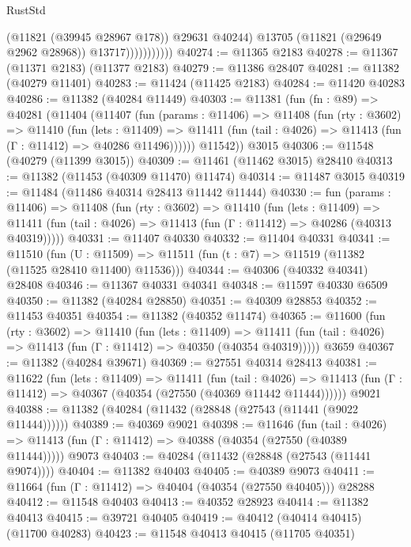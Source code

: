 \begin{lexlean}{RustStd}
\begin{coremodule}
                            (@11821 (@39945 @28967 @178))
                            @29631
                            @40244)
                          @13705
                          (@11821 (@29649 @2962 @28968))
                          @13717)))))))))))
@40274 := @11365 @2183
@40278 := @11367 (@11371 @2183) (@11377 @2183)
@40279 := @11386 @28407
@40281 := @11382 (@40279 @11401)
@40283 := @11424 (@11425 @2183)
@40284 := @11420 @40283
@40286 := @11382 (@40284 @11449)
@40303 := @11381
    (fun (fn : @89) =>
    @40281
      (@11404
        (@11407
          (fun (params : @11406) =>
          @11408
            (fun (rty : @3602) =>
            @11410
              (fun (lets : @11409) =>
              @11411 (fun (tail : @4026) => @11413 (fun (Γ : @11412) => @40286 @11496))))))
        @11542))
    @3015
@40306 := @11548 (@40279 (@11399 @3015))
@40309 := @11461 (@11462 @3015) @28410
@40313 := @11382 (@11453 (@40309 @11470) @11474)
@40314 := @11487 @3015
@40319 := @11484 (@11486 @40314 @28413 @11442 @11444)
@40330 := fun (params : @11406) =>
  @11408
    (fun (rty : @3602) =>
    @11410
      (fun (lets : @11409) =>
      @11411 (fun (tail : @4026) => @11413 (fun (Γ : @11412) => @40286 (@40313 @40319)))))
@40331 := @11407 @40330
@40332 := @11404 @40331
@40341 := @11510
    (fun (U : @11509) => @11511 (fun (t : @7) => @11519 (@11382 (@11525 @28410 @11400) @11536)))
@40344 := @40306 (@40332 @40341) @28408
@40346 := @11367 @40331 @40341
@40348 := @11597 @40330 @6509
@40350 := @11382 (@40284 @28850)
@40351 := @40309 @28853
@40352 := @11453 @40351
@40354 := @11382 (@40352 @11474)
@40365 := @11600
    (fun (rty : @3602) =>
    @11410
      (fun (lets : @11409) =>
      @11411 (fun (tail : @4026) => @11413 (fun (Γ : @11412) => @40350 (@40354 @40319)))))
    @3659
@40367 := @11382 (@40284 @39671)
@40369 := @27551 @40314 @28413
@40381 := @11622
    (fun (lets : @11409) =>
    @11411
      (fun (tail : @4026) =>
      @11413 (fun (Γ : @11412) => @40367 (@40354 (@27550 (@40369 @11442 @11444))))))
    @9021
@40388 := @11382 (@40284 (@11432 (@28848 (@27543 (@11441 (@9022 @11444))))))
@40389 := @40369 @9021
@40398 := @11646
    (fun (tail : @4026) => @11413 (fun (Γ : @11412) => @40388 (@40354 (@27550 (@40389 @11444)))))
    @9073
@40403 := @40284 (@11432 (@28848 (@27543 (@11441 @9074))))
@40404 := @11382 @40403
@40405 := @40389 @9073
@40411 := @11664 (fun (Γ : @11412) => @40404 (@40354 (@27550 @40405))) @28288
@40412 := @11548 @40403
@40413 := @40352 @28923
@40414 := @11382 @40413
@40415 := @39721 @40405
@40419 := @40412 (@40414 @40415) (@11700 @40283)
@40423 := @11548 @40413 @40415 (@11705 @40351)

\end{coremodule}
\end{lexlean}

